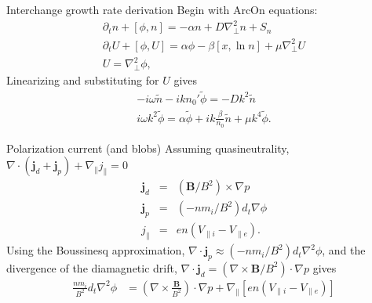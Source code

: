 \documentclass[12pt,table]{beamer}
\begin{document}
\begin{frame}{Interchange growth rate derivation}
Begin with ArcOn equations:
    \begin{align}
    \partial_t n + [\phi, n ] = - \alpha n + D \nabla_\bot ^2 n + S_n \label{eq:arc-n}\\
    \partial_t U + [\phi, U ] =  \alpha \phi - \beta [x, \ln n] + \mu \nabla_\bot ^2 U \label{eq:arc-u}\\
    U = \nabla_\bot ^2 \phi, \label{eq:arc-phi}
\end{align}
Linearizing and substituting for $U$ gives
\begin{align}
-i \omega \tilde{n} - i k n_0' \tilde{\phi}  = - D k^2 \tilde{n} \\
i \omega k^2 \tilde{\phi} = \alpha \tilde{\phi} + i k \frac{\beta}{n_0} \tilde{n} + \mu k^4 \tilde{\phi}.
\end{align}
\end{frame}

\begin{frame}{Polarization current (and blobs)}
    Assuming quasineutrality, $\nabla \cdot (\bm{j}_d + \bm{j}_p) + \nabla_\parallel j_\parallel = 0$
    \begin{eqnarray}
    \bm{j}_d &=& (\bm{B}/B^2) \times \nabla p \\
    \bm{j}_p &=& (-n m_i / B^2)d_t\nabla \phi \\
    j_\parallel &=& en(V_{\parallel i} - V_{\parallel e}).
    \end{eqnarray}
    Using the Boussinesq approximation, $\nabla \cdot \bm{j}_p \approx (-nm_i / B^2) d_t \nabla^2 \phi$, and the divergence of the diamagnetic drift, $\nabla \cdot \bm{j}_d = \left ( \nabla \times \bm{B}/B^2 \right) \cdot \nabla p $ gives
    \begin{align}
    \frac{nm_i }{B^2} d_t \nabla^2 \phi &= \left ( \nabla \times \frac{\bm{B}}{B^2} \right ) \cdot \nabla p + \nabla_\parallel [en(V_{\parallel i} - V_{\parallel e})]
    \end{align}
\end{frame}
\end{document}
